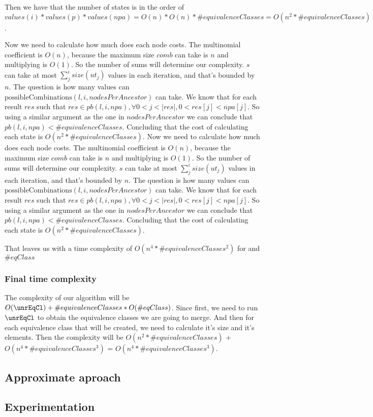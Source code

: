Then we have that the number of states is in the order of $values(i) * values(p) * values(npa) = O(n) * O(n) * \#equivalenceClasses = O(n^2 * \#equivalenceClasses)$.

Now we need to calculate how much does each node costs. The multinomial coefficient is $O(n)$, because the maximum size $comb$ can take is $n$ and multiplying is $O(1)$. So the number of sums will determine our complexity. $s$ can take at most $\sum_j^i size(ut_j)$ values in each iteration, and that's bounded by $n$. The question is how many values can $\mathrm{possibleCombinations}(l,i,nodesPerAncestor)$ can take. We know that for each result $res$ such that $res \in pb(l,i,npa), \forall 0<j<|res|, 0<res[j]<npa[j]$. So using a similar argument as the one in $nodesPerAncestor$ we can conclude that $pb(l,i,npa) < \#equivalenceClasses$. Concluding that the cost of calculating each state is $O(n^2 * \#equivalenceClasses)$.
Now we need to calculate how much does each node costs. The multinomial coefficient is $O(n)$, because the maximum size $comb$ can take is $n$ and multiplying is $O(1)$. So the number of sums will determine our complexity. $s$ can take at most $\sum_j^i size(ut_j)$ values in each iteration, and that's bounded by $n$. The question is how many values can $\mathrm{possibleCombinations}(l,i,nodesPerAncestor)$ can take. We know that for each result $res$ such that $res \in pb(l,i,npa), \forall 0<j<|res|, 0<res[j]<npa[j]$. So using a similar argument as the one in $nodesPerAncestor$ we can conclude that $pb(l,i,npa) < \#equivalenceClasses$. Concluding that the cost of calculating each state is $O(n^2 * \#equivalenceClasses)$.

That leaves us with a time complexity of $O(n^4 * \#equivalenceClasses^2)$ for \leftPossibleOrders and $\#eqClass$

\subsubsection{Final time complexity}

The complexity of our algorithm will be $O(\unrEqCl) + \#equivalenceClasses * O(\#eqClass)$. Since first, we need to run  $\unrEqCl$ to obtain the equivalence classes we are going to merge. And then for each equivalence class that will be created, we need to calculate it's size and it's elements. Then the complexity will be $O(n^2 * \#equivalenceClasses)$ + $O(n^4 * \#equivalenceClasses^3)$ = $O(n^4 * \#equivalenceClasses^3)$. 

\subsection{Approximate aproach}

\subsection{Experimentation}





